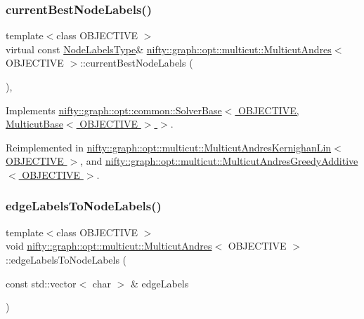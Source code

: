 \subsubsection{\texorpdfstring{current\+Best\+Node\+Labels()}{currentBestNodeLabels()}}
{\footnotesize\ttfamily template$<$class O\+B\+J\+E\+C\+T\+I\+VE $>$ \\
virtual const \hyperlink{classnifty_1_1graph_1_1opt_1_1multicut_1_1MulticutAndres_a6cd9d64abc4a98aa9745ce1ef0d4ecfe}{Node\+Labels\+Type}\& \hyperlink{classnifty_1_1graph_1_1opt_1_1multicut_1_1MulticutAndres}{nifty\+::graph\+::opt\+::multicut\+::\+Multicut\+Andres}$<$ O\+B\+J\+E\+C\+T\+I\+VE $>$\+::current\+Best\+Node\+Labels (\begin{DoxyParamCaption}{ }\end{DoxyParamCaption})\hspace{0.3cm}{\ttfamily [inline]}, {\ttfamily [virtual]}}



Implements \hyperlink{classnifty_1_1graph_1_1opt_1_1common_1_1SolverBase_a7bbe01ee201cf3157b251e54c5ff0619}{nifty\+::graph\+::opt\+::common\+::\+Solver\+Base$<$ O\+B\+J\+E\+C\+T\+I\+V\+E, Multicut\+Base$<$ O\+B\+J\+E\+C\+T\+I\+V\+E $>$ $>$}.



Reimplemented in \hyperlink{classnifty_1_1graph_1_1opt_1_1multicut_1_1MulticutAndresKernighanLin_ab06bb2d0f90c255f35453aad5b06eea3}{nifty\+::graph\+::opt\+::multicut\+::\+Multicut\+Andres\+Kernighan\+Lin$<$ O\+B\+J\+E\+C\+T\+I\+V\+E $>$}, and \hyperlink{classnifty_1_1graph_1_1opt_1_1multicut_1_1MulticutAndresGreedyAdditive_aed65f0ad0252b0cf069a969633271757}{nifty\+::graph\+::opt\+::multicut\+::\+Multicut\+Andres\+Greedy\+Additive$<$ O\+B\+J\+E\+C\+T\+I\+V\+E $>$}.

\mbox{\label{classnifty_1_1graph_1_1opt_1_1multicut_1_1MulticutAndres_ae9d13d3f75cc738cb1b5fbe69f98fcaa}} 
\subsubsection{\texorpdfstring{edge\+Labels\+To\+Node\+Labels()}{edgeLabelsToNodeLabels()}}
{\footnotesize\ttfamily template$<$class O\+B\+J\+E\+C\+T\+I\+VE $>$ \\
void \hyperlink{classnifty_1_1graph_1_1opt_1_1multicut_1_1MulticutAndres}{nifty\+::graph\+::opt\+::multicut\+::\+Multicut\+Andres}$<$ O\+B\+J\+E\+C\+T\+I\+VE $>$\+::edge\+Labels\+To\+Node\+Labels (\begin{DoxyParamCaption}\item[{const std\+::vector$<$ char $>$ \&}]{edge\+Labels }\end{DoxyParamCaption})\hspace{0.3cm}{\ttfamily [protected]}}


